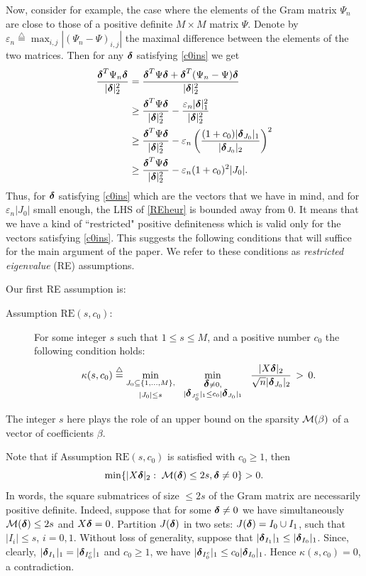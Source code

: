 \documentclass[dvips,aos]{imsart}
\numberwithin{equation}{section}
\theoremstyle{plain}
\def\triangleq{\stackrel{\triangle}{=}}
\def\scm{{\cal M}}
\def\eps{\varepsilon}
\def\RE#1#2{$\text{RE}(#1,#2)$}
\newcommand{\bD}{\mbox{\boldmath$\delta$}}
\begin{document}
Now, consider for example, the case where the elements of the Gram
matrix $\Psi_n$ are close to those of a positive definite $M\times
M$ matrix $\Psi$. Denote by
$\eps_n\triangleq\max_{i,j}|(\Psi_{n}-\Psi)_{i,j}|$ the maximal
difference between the elements of the two matrices. Then for any
$\bD $ satisfying \eqref{c0ins} we get
\begin{equation}
\label{REheur}
\begin{split}
\frac{\bD^T\Psi_n\bD}{|\bD|_2^2} &= \frac{\bD^T\Psi\bD
+\bD^T(\Psi_n-\Psi)\bD}{|\bD|_2^2}
\\
&\geq \frac{\bD^T\Psi\bD}{|\bD|_2^2} - \frac{\eps_n
|\bD|_1^2}{|\bD|_2^2}
\\
&\geq \frac{\bD^T\Psi\bD}{|\bD|_2^2} - \eps_n
\left(\frac{(1+c_0)|\bD_{J_0}|_1}{|\bD_{J_0}|_2} \right)^2
\\
&\geq \frac{\bD^T\Psi\bD}{|\bD|_2^2} - \eps_n (1+c_0)^2|J_0|.
\end{split}
\end{equation}
Thus, for $\bD $ satisfying \eqref{c0ins} which are the vectors that
we have in mind, and for $\eps_n|J_0|$ small enough, the LHS of
\eqref{REheur} is bounded away from 0. It means that we have a kind
of ``restricted" positive definiteness which is valid only for the
vectors satisfying \eqref{c0ins}. This suggests the following
conditions that will suffice for the main argument of the paper. We
refer to these conditions as {\it restricted eigenvalue} (RE)
assumptions.

Our first RE assumption is:



\begin{description}
\item[Assumption \RE s{c_0}:]
For some integer $s$ such that $1\le s\le M$,  and a positive number
$c_0$ the following condition holds:
$$
\kappa(s, c_0) \triangleq \min_{\substack{J_0\subseteq \{1,\dots,M\},\\
\\ |J_0|\le s}} \ \ \min_{\substack{\bD\neq 0, \\ |\bD_{J_0^c}|_1\le c_0|\bD_{J_0}|_1}}
%
\ \ \frac{|X\bD|_2}{\sqrt{n}|\bD_{J_0}|_2} \,> \, 0.
$$

\end{description}


The integer $s$ here plays the role of an upper bound on the
sparsity $\scm(\beta)$ of a vector of coefficients $\beta$.


Note that if Assumption \RE s{c_0} is satisfied with $c_0\geq 1$,
then $$\min\{|X\bD|_2:\; \scm(\bD)\le 2s,\bD\ne 0\}>0.$$ In words,
the square submatrices of size $\le 2s$ of the Gram matrix are
necessarily positive definite. Indeed, suppose that for some $\bD\ne
0$ we have simultaneously $\scm(\bD)\leq 2s$ and $X\bD=0$. Partition
$J(\bD)$ in two sets: $J(\bD)=I_0\cup I_1$, such that $|I_i|\leq s$,
$i=0,1$. Without loss of generality, suppose that $|\bD_{I_1}|_1\le
|\bD_{I_0}|_1$. Since, clearly, $|\bD_{I_1}|_1=|\bD_{I_0^c}|_1$ and
$c_0\ge 1$, we have $|\bD_{I_0^c}|_1\le c_0|\bD_{I_0}|_1$. Hence
$\kappa(s,c_0)=0$, a contradiction.
\end{document}
